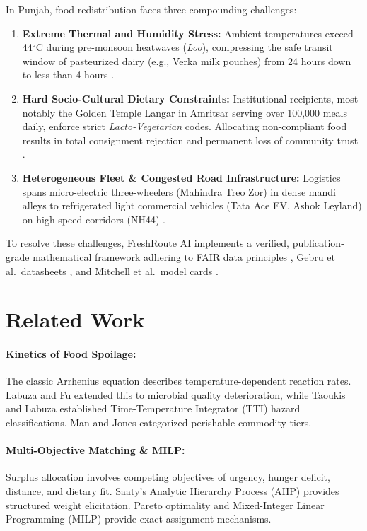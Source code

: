 \documentclass[11pt,a4paper]{article}
\begin{document}
In Punjab, food redistribution faces three compounding challenges:
\begin{enumerate}
    \item \textbf{Extreme Thermal and Humidity Stress:} Ambient temperatures exceed 44$^\circ$C during pre-monsoon heatwaves (\textit{Loo}), compressing the safe transit window of pasteurized dairy (e.g., Verka milk pouches) from 24 hours down to less than 4 hours \cite{kumar2010dairy,labuza1993kinetics}.
    \item \textbf{Hard Socio-Cultural Dietary Constraints:} Institutional recipients, most notably the Golden Temple Langar in Amritsar serving over 100,000 meals daily, enforce strict \textit{Lacto-Vegetarian} codes. Allocating non-compliant food results in total consignment rejection and permanent loss of community trust \cite{icmr2017ethics,fssai2011}.
    \item \textbf{Heterogeneous Fleet \& Congested Road Infrastructure:} Logistics spans micro-electric three-wheelers (Mahindra Treo Zor) in dense mandi alleys to refrigerated light commercial vehicles (Tata Ace EV, Ashok Leyland) on high-speed corridors (NH44) \cite{tataaceevspec,ashokleylandspec}.
\end{enumerate}

To resolve these challenges, FreshRoute AI implements a verified, publication-grade mathematical framework adhering to FAIR data principles \cite{wilkinson2016fair}, Gebru et al.\ datasheets \cite{gebru2021datasheets}, and Mitchell et al.\ model cards \cite{mitchell2019modelcards}.

\section{Related Work}
\paragraph{Kinetics of Food Spoilage:} The classic Arrhenius equation \cite{arrhenius1889} describes temperature-dependent reaction rates. Labuza and Fu \cite{labuza1993kinetics} extended this to microbial quality deterioration, while Taoukis and Labuza \cite{taoukis1997tti} established Time-Temperature Integrator (TTI) hazard classifications. Man and Jones \cite{man2002shelflife} categorized perishable commodity tiers.

\paragraph{Multi-Objective Matching \& MILP:} Surplus allocation involves competing objectives of urgency, hunger deficit, distance, and dietary fit. Saaty's Analytic Hierarchy Process (AHP) \cite{saaty1980ahp} provides structured weight elicitation. Pareto optimality \cite{pareto1896,deb2002nsga2} and Mixed-Integer Linear Programming (MILP) \cite{wolsey1998integer} provide exact assignment mechanisms.
\end{document}
